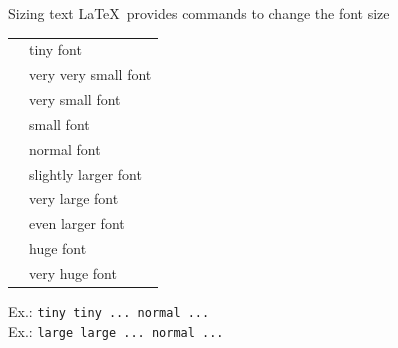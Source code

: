 \documentclass[table]{beamer}
\newcommand{\latex}{\LaTeX\ }
\begin{document}
\begin{frame}[fragile]{Sizing text}
    \latex provides commands to change the font size

    \begin{table}
        \begin{flushleft}
        \begin{tabular}{ll}
        \texttt{\tiny} & {\tiny tiny font}\\
        \texttt{\scriptsize} &{\scriptsize very very small font}\\
        \texttt{\footnotesize} &{\footnotesize very small font}\\
        \texttt{\small} &{\small small font}\\
        \texttt{\normalsize} &{\normalsize normal font}\\
        \texttt{\large} &{\large slightly larger font}\\
        \texttt{\Large} &{\Large very large font}\\
        \texttt{\LARGE} &{\LARGE even larger font}\\
        \texttt{\huge} &{\huge huge font}\\
        \texttt{\Huge} &{\Huge very huge font}\\
        \end{tabular}
        \end{flushleft}
    \end{table}

    Ex.: \texttt{\tiny tiny tiny ... \normalsize normal ...}\\
    Ex.: \texttt{{\LARGE large large ...} normal ...}
\end{frame}
\end{document}
